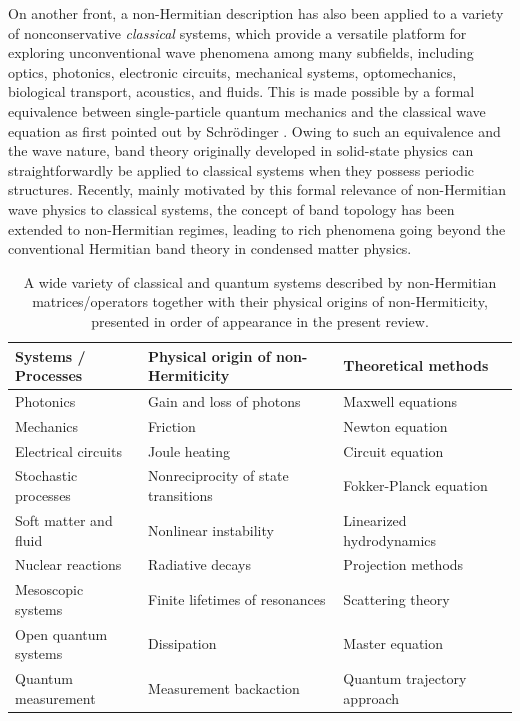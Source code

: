 \documentclass{tADP2e}
\theoremstyle{plain}
\theoremstyle{plain}
\theoremstyle{definition}
\begin{document}
On another front, a non-Hermitian description has also been applied to a variety of nonconservative {\it classical} systems, which provide a versatile platform for exploring unconventional wave phenomena among many subfields, including optics, photonics, electronic circuits, mechanical systems, optomechanics, biological transport, acoustics, and fluids. This is made possible by a formal equivalence between single-particle quantum mechanics and the classical wave equation as first pointed out by Schr{\"o}dinger \cite{SE26}. Owing to such an equivalence and the wave nature, band theory originally developed in solid-state physics can straightforwardly be applied to classical systems when they possess periodic structures.  Recently, mainly motivated by this formal relevance of non-Hermitian wave physics to classical systems, the concept of band topology has been extended to non-Hermitian regimes, leading to rich phenomena going beyond the conventional Hermitian band theory in condensed matter physics.   

\begin{table}[b]
\caption{\label{table1} A wide variety of classical and quantum systems described by non-Hermitian matrices/operators together with their physical origins of non-Hermiticity, presented in order of appearance in the present review. }
\footnotesize
\begin{tabular}{p{3.5cm}p{5cm}p{5cm}l}
\midrule \midrule
Systems / Processes & Physical origin of non-Hermiticity& Theoretical methods \\ \midrule 
Photonics & Gain and loss of photons & 
Maxwell equations \cite{AR05,REG07}
\\
Mechanics   & Friction & Newton equation \cite{KCL14,HSD16}
 \\
Electrical circuits &  Joule heating &  Circuit equation \cite{YNJ09}
\\
Stochastic processes & Nonreciprocity of state transitions & 
Fokker-Planck equation \cite{RH96,GCW04}
\\
Soft matter and fluid & Nonlinear instability & 
Linearized hydrodynamics \cite{MMC13,CI13,JXZ16}
\\
Nuclear reactions & Radiative decays & Projection methods \cite{HF58,HF62,CCT68}
\\
Mesoscopic systems& Finite lifetimes of resonances & Scattering theory \cite{CDT92,NM98}
\\
Open quantum systems & Dissipation& Master equation \cite{GV76,LG76}
\\
Quantum measurement & Measurement backaction& Quantum trajectory approach \cite{MU89,UM90,DJ92,DR92,GCH92,HC93}
\\
\midrule \midrule
\end{tabular}
\end{table}
\end{document}
